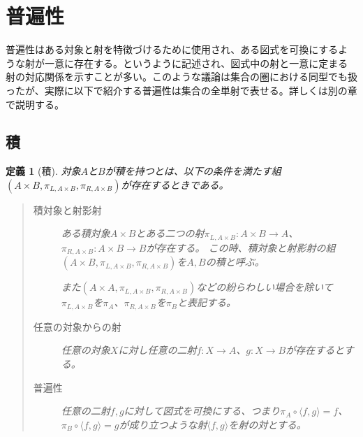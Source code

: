 \documentclass[uplatex,dvipdfmx]{jsarticle}
\newcommand{\arrow}{\rightarrow}
\newcommand{\tuple}[1]{\langle #1\rangle}
\newcommand{\mor}[3]{#1:#2\arrow #3}
\newtheorem{define}{定義}[section]
\numberwithin{proof}{subsection}
\numberwithin{prop}{subsection}
\numberwithin{define}{subsection}
\begin{document}
	\section{普遍性}
	普遍性はある対象と射を特徴づけるために使用され、ある図式を可換にするような射が一意に存在する。というように記述され、図式中の射と一意に定まる射の対応関係を示すことが多い。このような議論は集合の圏における同型でも扱ったが、実際に以下で紹介する普遍性は集合の全単射で表せる。詳しくは別の章で説明する。
	\subsection{積}
	\begin{define}[積]
		対象$A$と$B$が積を持つとは、以下の条件を満たす組$(A\times B,\pi_{L,A\times B},\pi_{R,A\times B})$が存在するときである。
		\begin{quote}
			\begin{description}
			\item[積対象と射影射]ある積対象$A\times B$とある二つの射$\mor{\pi_{L,A\times B}}{A\times B}{A}$、$\mor{\pi_{R,A\times B}}{A\times B}{B}$が存在する。
			この時、積対象と射影射の組$(A\times B,\pi_{L,A\times B},\pi_{R,A\times B})$を$A,B$の積と呼ぶ。


			\begin{center}
			\end{center}
			また$(A\times A,\pi_{L,A\times B},\pi_{R,A\times B})$などの紛らわしい場合を除いて$\pi_{L,A\times B}$を$\pi_A$、$\pi_{R,A\times B}$を$\pi_B$と表記する。
			\item[任意の対象からの射]任意の対象$X$に対し任意の二射$\mor{f}{X}{A}$、$\mor{g}{X}{B}$が存在するとする。
			\begin{center}
			\end{center}
			\item[普遍性]任意の二射$f,g$に対して図式を可換にする、つまり$\pi_A\circ\tuple{f,g}=f$、$\pi_B\circ\tuple{f,g}=g$が成り立つような射$\tuple{f,g}$を射の対とする。


\end{description}
\end{quote}
\end{define}
\end{document}
